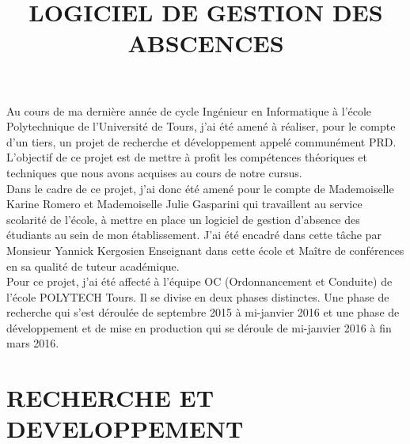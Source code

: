 \documentclass[overfullbox]{polytech/polytech}
\title{LOGICIEL DE GESTION DES ABSCENCES}
\begin{document}
\maketitle
 
 
Au cours de ma dernière année de cycle Ingénieur en Informatique à l'école Polytechnique de l'Université de Tours, j'ai été amené à réaliser,  pour le compte d'un tiers, un projet de recherche et développement appelé communément PRD. L’objectif de ce projet est de mettre à profit les compétences théoriques et techniques que nous avons acquises au cours de notre cursus.\\

Dans le cadre de ce projet, j'ai donc été amené pour le compte de Mademoiselle Karine Romero et Mademoiselle Julie Gasparini qui travaillent au service scolarité de l'école, 
à mettre en place un logiciel de gestion d'absence des étudiants au sein de mon établissement. J'ai été encadré dans cette tâche par Monsieur Yannick Kergosien Enseignant dans cette école et Maître de conférences en sa qualité de tuteur académique.\\

Pour ce projet, j'ai été affecté à l'équipe OC (Ordonnancement et Conduite) de l'école POLYTECH Tours. Il se divise en deux phases distinctes. Une phase de recherche qui s'est déroulée de septembre 2015 à mi-janvier 2016 et une phase de développement et de mise en production qui se déroule de mi-janvier 2016 à fin mars 2016.




\part{RECHERCHE ET DEVELOPPEMENT}
\label{part:recherche}
\end{document}
